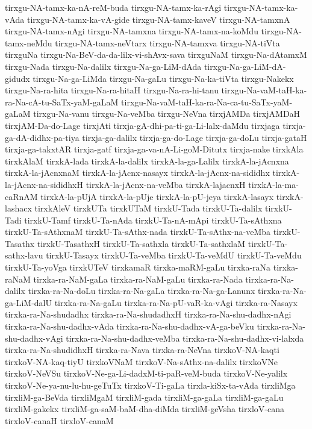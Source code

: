 {tirxgu-NA-tamx-ka-nA-reM-buda
tirxgu-NA-tamx-ka-rAgi
tirxgu-NA-tamx-ka-vAda
tirxgu-NA-tamx-ka-vA-gide
tirxgu-NA-tamx-kaveV
tirxgu-NA-tamxnA
tirxgu-NA-tamx-nAgi
tirxgu-NA-tamxna
tirxgu-NA-tamx-na-koMdu
tirxgu-NA-tamx-neMdu
tirxgu-NA-tamx-neVtarx
tirxgu-NA-tamxva
tirxgu-NA-tiVta
tirxguNa
tirxgu-Na-BeV-da-da-lilx-vi-shAvx-sava
tirxguNaM
tirxgu-Na-dAtamxM
tirxgu-Nada
tirxgu-Na-dalilx
tirxgu-Na-ga-LiM-dAda
tirxgu-Na-ga-LiM-dA-gidudx
tirxgu-Na-ga-LiMda
tirxgu-Na-gaLu
tirxgu-Na-ka-tiVta
tirxgu-Nakekx
tirxgu-Na-ra-hita
tirxgu-Na-ra-hitaH
tirxgu-Na-ra-hi-tanu
tirxgu-Na-vaM-taH-ka-ra-Na-cA-tu-SaTx-yaM-gaLaM
tirxgu-Na-vaM-taH-ka-ra-Na-ca-tu-SaTx-yaM-gaLaM
tirxgu-Na-vanu
tirxgu-Na-veMba
tirxgu-NeVna
tirxjAMDa
tirxjAMDaH
tirxjAM-Da-do-Lage
tirxjAti
tirxja-gA-dhi-pa-ti-ga-Li-lalx-daMdu
tirxjaga
tirxja-ga-dA-didhx-pa-tiya
tirxja-ga-dalilx
tirxja-ga-do-Lage
tirxja-ga-doLu
tirxja-gataH
tirxja-ga-takxtAR
tirxja-gatf
tirxja-ga-va-nA-Li-goM-Ditutx
tirxja-nake
tirxkAla
tirxkAlaM
tirxkA-lada
tirxkA-la-dalilx
tirxkA-la-ga-Lalilx
tirxkA-la-jAcnxna
tirxkA-la-jAcnxnaM
tirxkA-la-jAcnx-nasayx
tirxkA-la-jAcnx-na-sididhx
tirxkA-la-jAcnx-na-sididhxH
tirxkA-la-jAcnx-na-veMba
tirxkA-lajacnxH
tirxkA-la-ma-caRnAM
tirxkA-la-pUjA
tirxkA-la-pUje
tirxkA-la-pU-jeya
tirxkA-lasayx
tirxkA-lashacx
tirxkAleV
tirxkUTa
tirxkUTaM
tirxkU-Tada
tirxkU-Ta-dalilx
tirxkU-Tadi
tirxkU-Tamf
tirxkU-Ta-nAda
tirxkU-Ta-nA-mApi
tirxkU-Ta-sAthxna
tirxkU-Ta-sAthxnaM
tirxkU-Ta-sAthx-nada
tirxkU-Ta-sAthx-na-veMba
tirxkU-Tasathx
tirxkU-TasathxH
tirxkU-Ta-sathxla
tirxkU-Ta-sathxlaM
tirxkU-Ta-sathx-lavu
tirxkU-Tasayx
tirxkU-Ta-veMba
tirxkU-Ta-veMdU
tirxkU-Ta-veMdu
tirxkU-Ta-yoVga
tirxkUTeV
tirxkamaR
tirxka-maRM-gaLu
tirxka-raNa
tirxka-raNaM
tirxka-ra-NaM-gaLa
tirxka-ra-NaM-gaLu
tirxka-ra-Nada
tirxka-ra-Na-dalilx
tirxka-ra-Na-doLu
tirxka-ra-Na-gaLa
tirxka-ra-Na-ga-Lanunx
tirxka-ra-Na-ga-LiM-dalU
tirxka-ra-Na-gaLu
tirxka-ra-Na-pU-vaR-ka-vAgi
tirxka-ra-Nasayx
tirxka-ra-Na-shudadhx
tirxka-ra-Na-shudadhxH
tirxka-ra-Na-shu-dadhx-nAgi
tirxka-ra-Na-shu-dadhx-vAda
tirxka-ra-Na-shu-dadhx-vA-ga-beVku
tirxka-ra-Na-shu-dadhx-vAgi
tirxka-ra-Na-shu-dadhx-veMba
tirxka-ra-Na-shu-dadhx-vi-lalxda
tirxka-ra-Na-shudidhxH
tirxka-ra-Nava
tirxka-ra-NeVna
tirxkoV-NA-kaqti
tirxkoV-NA-kaq-tiyU
tirxkoVNaM
tirxkoV-Na-sAthx-na-dalilx
tirxkoVNe
tirxkoV-NeVSu
tirxkoV-Ne-ga-Li-dadxM-ti-paR-veM-buda
tirxkoV-Ne-yalilx
tirxkoV-Ne-ya-nu-lu-hu-geTuTx
tirxkoV-Ti-gaLa
tirxla-kiSx-ta-vAda
tirxliMga
tirxliM-ga-BeVda
tirxliMgaM
tirxliM-gada
tirxliM-ga-gaLa
tirxliM-ga-gaLu
tirxliM-gakekx
tirxliM-ga-saM-baM-dha-diMda
tirxliM-geVsha
tirxloV-cana
tirxloV-canaH
tirxloV-canaM
}
